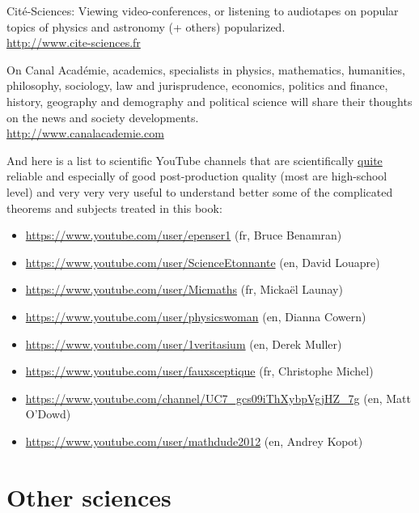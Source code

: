 	\bcdfrance{} Cité-Sciences: Viewing video-conferences, or listening to audiotapes on popular topics of physics and astronomy (+ others) popularized.\\
	\href{http://www.cite-sciences.fr}{\color{blue}http://www.cite-sciences.fr}
	
	\bcdfrance{} On Canal Académie, academics, specialists in physics, mathematics, humanities, philosophy, sociology, law and jurisprudence, economics, politics and finance, history, geography and demography and political science will share their thoughts on the news and society developments.\\
	\href{http://www.canalacademie.com}{\color{blue}http://www.canalacademie.com}
	
	\pagebreak
	And here is a list to scientific YouTube channels that are scientifically \underline{quite} reliable and especially of good post-production quality (most are high-school level) and very very very useful to understand better some of the complicated theorems and subjects treated in this book:
	\begin{itemize}
		 \item \url{https://www.youtube.com/user/epenser1} (fr, Bruce Benamran)
		 
		 \item \url{https://www.youtube.com/user/ScienceEtonnante} (en, David Louapre)
		 
		 \item \url{https://www.youtube.com/user/Micmaths} (fr, Mickaël Launay)
		 
		 \item \url{https://www.youtube.com/user/physicswoman} (en, Dianna Cowern)
		 
		 \item \url{https://www.youtube.com/user/1veritasium} (en, Derek Muller)
		 
		 \item \url{https://www.youtube.com/user/fauxsceptique} (fr, Christophe Michel)
		 
		 \item \url{https://www.youtube.com/channel/UC7_gcs09iThXybpVgjHZ_7g} (en, Matt O'Dowd)
		 
		 \item \url{https://www.youtube.com/user/mathdude2012} (en, Andrey Kopot)
	\end{itemize}

	\pagebreak
	\section{Other sciences}

